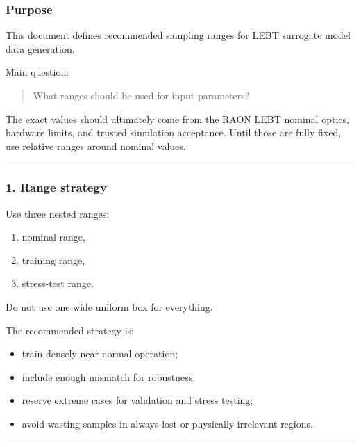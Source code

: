 \documentclass[
]{article}
\providecommand{\tightlist}{%
  \setlength{\itemsep}{0pt}\setlength{\parskip}{0pt}}
\begin{document}
\hypertarget{purpose-3}{%
\subsubsection{Purpose}\label{purpose-3}}

This document defines recommended sampling ranges for LEBT surrogate
model data generation.

Main question:

\begin{quote}
What ranges should be used for input parameters?
\end{quote}

The exact values should ultimately come from the RAON LEBT nominal
optics, hardware limits, and trusted simulation acceptance. Until those
are fully fixed, use relative ranges around nominal values.

\begin{center}\rule{0.5\linewidth}{0.5pt}\end{center}

\hypertarget{range-strategy}{%
\subsubsection{1. Range strategy}\label{range-strategy}}

Use three nested ranges:

\begin{enumerate}
\def\labelenumi{\arabic{enumi}.}
\tightlist
\item
  nominal range,
\item
  training range,
\item
  stress-test range.
\end{enumerate}

Do not use one wide uniform box for everything.

The recommended strategy is:

\begin{itemize}
\tightlist
\item
  train densely near normal operation;
\item
  include enough mismatch for robustness;
\item
  reserve extreme cases for validation and stress testing;
\item
  avoid wasting samples in always-lost or physically irrelevant regions.
\end{itemize}

\begin{center}\rule{0.5\linewidth}{0.5pt}\end{center}
\end{document}
